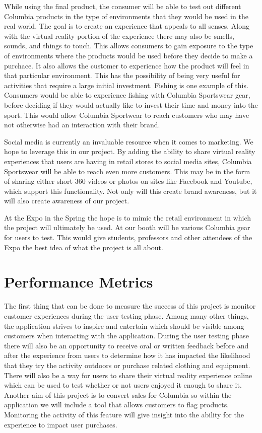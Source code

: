 \documentclass[10pt, oneside,onecolumn,draftclsnofoot]{IEEEtran}
\begin{document}
While using the final product, the consumer will be able to test out different
Columbia products in the type of environments that they would be used in
the real world. The goal is to create an experience that appeals to all senses.
Along with the virtual reality portion of the experience there may also be
smells, sounds, and things to touch. This allows consumers to gain exposure to
the type of environments where the products would be used before they decide to
make a purchace. It also allows the customer to experience how the product will
feel in that particular environment. This has the possibility of being very
useful for activities that require a large initial investment. Fishing is one
example of this. Consumers would be able to experience fishing with Columbia
Sportswear gear, before deciding if they would actually like to invest their
time and money into the sport. This would allow Columbia Sportwear to reach
customers who may have not otherwise had an interaction with their brand.

Social media is currently an invaluable resource when it comes to marketing.
We hope to leverage this in our project. By adding the ability to share
virtual reality experiences that users are having in retail stores to social
media sites, Columbia Sportswear will be able to reach even more customers.
This may be in the form of sharing either short 360 videos or photos on sites
like Facebook and Youtube, which support this functionality. Not only will this
create brand awareness, but it will also create awareness of our project.

At the Expo in the Spring the hope is to mimic the retail environment in which
the project will ultimately be used. At our booth will be various Columbia gear
for users to test. This would give students, professors and other attendees of
the Expo the best idea of what the project is all about.

\section{Performance Metrics}
The first thing that can be done to measure the success of this project is
monitor customer experiences during the user testing phase. Among many other
things, the application strives to inspire and entertain which should be visible
among customers when interacting with the application. During the user testing
phase there will also be an opportunity to receive oral or written feedback
before and after the experience from users to determine how it has impacted the
likelihood that they try the activity outdoors or purchase related clothing and
equipment. There will also be a way for users to share their virtual reality
experience online which can be used to test whether or not users enjoyed it
enough to share it. Another aim of this project is to convert sales for Columbia
so within the application we will include a tool that allows customers to flag
products. Monitoring the activity of this feature will give insight into the
ability for the experience to impact user purchases.
\end{document}
